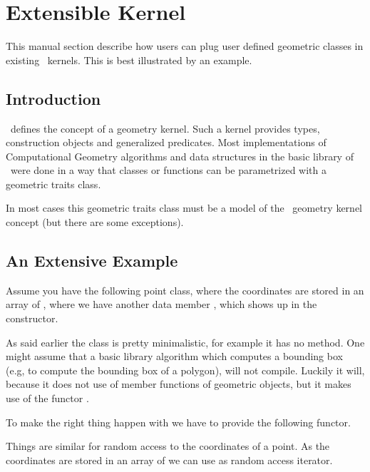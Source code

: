 \section{Extensible Kernel\label{section-extensible-kernel}}

This manual section describe how users can plug user defined
geometric classes in existing \cgal\ kernels.  This is best
illustrated by an example.


\subsection{Introduction}

\cgal\ defines the concept of a geometry kernel. Such a kernel provides types,
construction objects and generalized predicates. Most implementations
of Computational Geometry algorithms and data structures in the basic
library of \cgal\ were done in a way that classes or functions can be
parametrized with a geometric traits class.

In most cases this geometric traits class must be a model of the \cgal\ geometry
kernel concept (but there are some exceptions).




\subsection{An Extensive Example}

Assume you have the following point class, where the coordinates are
stored in an array of , where we have another data member
, which shows up in the constructor.


As said earlier the class is pretty minimalistic, for
example it has no  method.  One
might assume that a basic library algorithm which computes 
a bounding box (e.g, to compute the bounding box of a polygon),
will not compile. Luckily it will, because it does not
use of member functions of geometric objects, but it makes
use of the functor .

To make the right thing happen with  we
have to provide the following functor.


Things are similar for random access to the 
coordinates of a point. As the coordinates are stored
in an array of  we can use  as
random access iterator.


